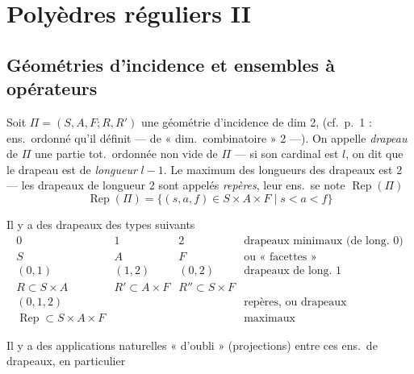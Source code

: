 \documentclass[11pt,a4paper]{article}
\begin{document}
\section*{Polyèdres réguliers II}


\subsection*{Géométries d'incidence et ensembles à opérateurs}

Soit $\Pi = (S, A, F ; R, R')$ une géométrie d'incidence de dim 2,
 (cf.\ p.~1 : ens.\ ordonné qu'il définit --- de
« dim.\ combinatoire » 2 ---). On appelle \emph{drapeau} de $\Pi$ une partie
tot.\ ordonnée non vide de $\Pi$ --- si son cardinal est $l$, on dit que le
drapeau est de \emph{longueur} $l-1$. Le maximum des longueurs des
drapeaux est 2 --- les drapeaux de longueur 2 sont appelés \emph{repères},
leur ens.\ se note $\operatorname{Rep}(\Pi)$
\[
  \operatorname{Rep}(\Pi) = \{(s, a, f) \in S \times A \times F \mid
  s < a < f\}
\]

Il y a des drapeaux des types suivants
\[
  \begin{array}{lll|l}
    0 & 1 & 2 & \text{drapeaux minimaux (de long.\ 0)} \\
    S & A & F & \text{ou « facettes »} \\[4pt]
    (0,1) & (1,2) & (0,2) & \text{drapeaux de long.\ 1} \\
    R \subset S \times A & R' \subset A \times F & R'' \subset S \times F & \\[4pt]
    (0,1,2) & & & \text{repères, ou drapeaux} \\
    \operatorname{Rep} \subset S \times A \times F & & & \text{maximaux}
  \end{array}
\]

Il y a des applications naturelles « d'oubli » (projections) entre ces
ens.\ de drapeaux, en particulier

\end{document}
